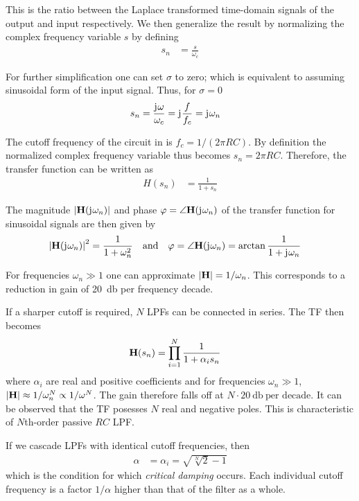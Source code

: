 This is the ratio between the Laplace transformed time-domain signals of the output and input respectively. We then generalize the result by normalizing the complex frequency variable $s$ by defining
\begin{align}
    s_n &= \frac{s}{\omega_c}
\end{align}

For further simplification one can set $\sigma$ to zero; which is equivalent to assuming sinusoidal form of the input signal.
Thus, for $\sigma=0$
\begin{align}
    s_n &= \frac{\mathrm{j}\mkern1mu\omega}{\omega_c} = \mathrm{j}\mkern1mu\frac{f}{f_c} = \mathrm{j}\mkern1mu\omega_n
\end{align}

The cutoff frequency of the circuit in  is $f_c=1/(2\pi RC)$. By definition the normalized complex frequency variable thus becomes $s_n=2\pi RC$. Therefore, the transfer function can be written as
\begin{align}
    H(s_n) &= \frac{1}{1+s_n}
\end{align}

The magnitude $\abs{\mathbf{H}(\mathrm{j}\mkern1mu\omega_n)}$ and phase $\varphi=\angle\mathbf{H}(\mathrm{j}\mkern1mu\omega_n)$ of the transfer function for sinusoidal signals are then given by
\begin{align}
    \abs{\mathbf{H}(\mathrm{j}\mkern1mu\omega_n)}^2 &= \frac{1}{1+\omega_n^2} &&\text{and} &\varphi &= \angle\mathbf{H}(\mathrm{j}\mkern1mu\omega_n) = \arctan\frac{1}{1 + \mathrm{j}\mkern1mu\omega_n}
\end{align}

For frequencies $\omega_n\gg 1$ one can approximate $\abs{\mathbf{H}}=1/\omega_n$. This corresponds to a reduction in gain of \SI{20}{\decibel} per frequency decade.

If a sharper cutoff is required, $N$ \ac{LPF}s can be connected in series. The \ac{TF} then becomes
\begin{align}
    \mathbf{H}(s_n) &= \prod\limits_{i=1}^{N}\frac{1}{1+\alpha_i s_n}
\end{align}
where $\alpha_i$ are real and positive coefficients and for frequencies $\omega_n\gg 1$, $\abs{\mathbf{H}}\approx 1/\omega_n^N\propto 1/\omega^N$. The gain therefore falls off at $N\cdot\SI{20}{\decibel}\:\text{per decade}$. It can be observed that the \ac{TF} posesses $N$ real and negative poles. This is characteristic of $N$th-order passive $RC$ \ac{LPF}.

If we cascade \ac{LPF}s with identical cutoff frequencies, then
\begin{align}
    \alpha &= \alpha_i = \sqrt{\sqrt[N]{2}-1}
\end{align}
which is the condition for which \emph{critical damping} occurs. Each individual cutoff frequency is a factor $1/\alpha$ higher than that of the filter as a whole.

